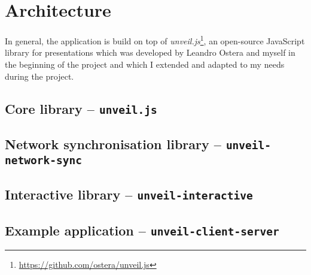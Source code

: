 \section{Architecture}
\label{sec:implementation-architecture}

In general, the application is build on top of \textit{unveil.js}\footnote{\url{https://github.com/ostera/unveil.js}}, an open-source JavaScript library for presentations which was developed by Leandro Ostera and myself in the beginning of the project and which I extended and adapted to my needs during the project.

\subsection{Core library -- \texttt{unveil.js}}
\label{sec:implementation-architecture-core}

\subsection{Network synchronisation library -- \texttt{unveil-network-sync}}
\label{sec:implementation-architecture-network-sync}

\subsection{Interactive library -- \texttt{unveil-interactive}}
\label{sec:implementation-architecture-interactive}

\subsection{Example application -- \texttt{unveil-client-server}}
\label{sec:implementation-architecture-client-server}
